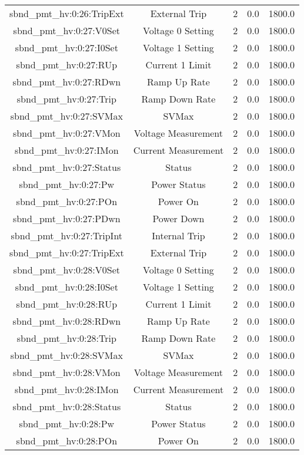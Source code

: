\begin{table}[ptb]
\begin{tabular}{c | c c c c}
sbnd_pmt_hv:0:26:TripExt & External Trip & 2 & 0.0 & 1800.0\\ 
sbnd_pmt_hv:0:27:V0Set & Voltage 0 Setting & 2 & 0.0 & 1800.0\\ 
sbnd_pmt_hv:0:27:I0Set & Voltage 1 Setting & 2 & 0.0 & 1800.0\\ 
sbnd_pmt_hv:0:27:RUp & Current 1 Limit & 2 & 0.0 & 1800.0\\ 
sbnd_pmt_hv:0:27:RDwn & Ramp Up Rate & 2 & 0.0 & 1800.0\\ 
sbnd_pmt_hv:0:27:Trip & Ramp Down Rate & 2 & 0.0 & 1800.0\\ 
sbnd_pmt_hv:0:27:SVMax & SVMax & 2 & 0.0 & 1800.0\\ 
sbnd_pmt_hv:0:27:VMon & Voltage Measurement & 2 & 0.0 & 1800.0\\ 
sbnd_pmt_hv:0:27:IMon & Current Measurement & 2 & 0.0 & 1800.0\\ 
sbnd_pmt_hv:0:27:Status & Status & 2 & 0.0 & 1800.0\\ 
sbnd_pmt_hv:0:27:Pw & Power Status & 2 & 0.0 & 1800.0\\ 
sbnd_pmt_hv:0:27:POn & Power On & 2 & 0.0 & 1800.0\\ 
sbnd_pmt_hv:0:27:PDwn & Power Down & 2 & 0.0 & 1800.0\\ 
sbnd_pmt_hv:0:27:TripInt & Internal Trip & 2 & 0.0 & 1800.0\\ 
sbnd_pmt_hv:0:27:TripExt & External Trip & 2 & 0.0 & 1800.0\\ 
sbnd_pmt_hv:0:28:V0Set & Voltage 0 Setting & 2 & 0.0 & 1800.0\\ 
sbnd_pmt_hv:0:28:I0Set & Voltage 1 Setting & 2 & 0.0 & 1800.0\\ 
sbnd_pmt_hv:0:28:RUp & Current 1 Limit & 2 & 0.0 & 1800.0\\ 
sbnd_pmt_hv:0:28:RDwn & Ramp Up Rate & 2 & 0.0 & 1800.0\\ 
sbnd_pmt_hv:0:28:Trip & Ramp Down Rate & 2 & 0.0 & 1800.0\\ 
sbnd_pmt_hv:0:28:SVMax & SVMax & 2 & 0.0 & 1800.0\\ 
sbnd_pmt_hv:0:28:VMon & Voltage Measurement & 2 & 0.0 & 1800.0\\ 
sbnd_pmt_hv:0:28:IMon & Current Measurement & 2 & 0.0 & 1800.0\\ 
sbnd_pmt_hv:0:28:Status & Status & 2 & 0.0 & 1800.0\\ 
sbnd_pmt_hv:0:28:Pw & Power Status & 2 & 0.0 & 1800.0\\ 
sbnd_pmt_hv:0:28:POn & Power On & 2 & 0.0 & 1800.0\\ 

\end{tabular}
\end{table}
